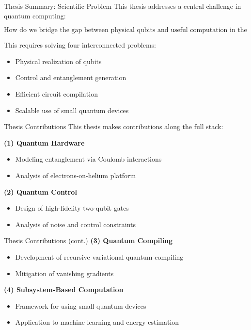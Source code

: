 \documentclass[aspectratio=169]{beamer}
\begin{document}
\begin{frame}{Thesis Summary: Scientific Problem}
This thesis addresses a central challenge in quantum computing:

\medskip

\[
\text{How do we bridge the gap between physical qubits and useful computation in the NISQ era?}
\]

\medskip

This requires solving four interconnected problems:

\begin{itemize}
    \item Physical realization of qubits
    \item Control and entanglement generation
    \item Efficient circuit compilation
    \item Scalable use of small quantum devices
\end{itemize}
\end{frame}

\begin{frame}{Thesis Contributions}
This thesis makes contributions along the full stack:

\medskip

\textbf{(1) Quantum Hardware}
\begin{itemize}
    \item Modeling entanglement via Coulomb interactions
    \item Analysis of electrons-on-helium platform
\end{itemize}

\medskip

\textbf{(2) Quantum Control}
\begin{itemize}
    \item Design of high-fidelity two-qubit gates
    \item Analysis of noise and control constraints
\end{itemize}
\end{frame}

\begin{frame}{Thesis Contributions (cont.)}
\textbf{(3) Quantum Compiling}
\begin{itemize}
    \item Development of recursive variational quantum compiling
    \item Mitigation of vanishing gradients
\end{itemize}

\medskip

\textbf{(4) Subsystem-Based Computation}
\begin{itemize}
    \item Framework for using small quantum devices
    \item Application to machine learning and energy estimation
\end{itemize}
\end{frame}
\end{document}
